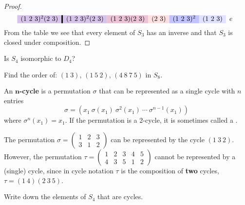 \documentclass{ximera}
\begin{document}
\begin{example}
\begin{proof}
\begin{gather*}
\begin{array}{c!{\vline width 2pt}cccccc}
        (1\ 2\ 3)^2 (2\ 3)\cellcolor{blue!66!red!24!white}      & (1\ 2\ 3)^2 (2\ 3)\cellcolor{blue!66!red!24!white} & (1\ 2\ 3)(2\ 3) \cellcolor{blue!33!red!24!white}    & (2\ 3) \cellcolor{red!12!white}   & (1\ 2\ 3)^2\cellcolor{blue!24!white}    & (1\ 2\ 3)\cellcolor{blue!12!white}   & e     \\  
      \end{array}
    \end{gather*}
    From the table we see that every element of $S_3$ has an inverse
    and that $S_3$ is closed under composition.
  \end{proof}
\end{example}

\begin{exercise}
  Is $S_4$ isomorphic to $D_4$?
\end{exercise}


\begin{exercise}
  Find the order of: $(1 \ 3)$, $(1 \ 5 \ 2)$, $(4 \ 8 \ 7 \ 5)$ in
  $S_8$.
\end{exercise}



\begin{definition}
  An \textbf{$\boldsymbol{n}$-cycle} is a permutation $\sigma$ that
  can be represented as a single cycle with $n$ entries
  \[
  \sigma = (x_1\ \sigma(x_1)\ \sigma^2(x_1)\ \cdots\ \sigma^{n-1}(x_1))
  \]
  where $\sigma^n(x_1) = x_1$.  If the permutation is a $2$-cycle, it
  is sometimes called a .
\end{definition}


\begin{example}
  The permutation $\sigma = \left(\begin{smallmatrix}
    1 & 2 & 3\\
    3 & 1 & 2
  \end{smallmatrix}\right)$ can be represented by the cycle $(1\ 3 \ 2)$. However,
  the permutation $\tau = \left(\begin{smallmatrix}
    1 & 2 & 3 & 4 & 5\\
    4 & 3 & 5 & 1 & 2
  \end{smallmatrix}\right)$ cannot be represented by a (single) cycle, since in cycle notation $\tau$ is the composition of \textbf{two} cycles, $\tau = (1\ 4)(2\ 3\ 5)$.
\end{example}




\begin{exercise}
  Write down the elements of $S_4$ that are cycles.
\end{exercise}
\end{document}

